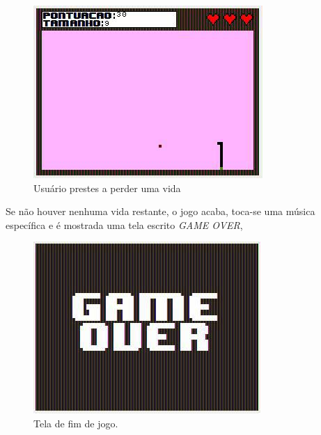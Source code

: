 \documentclass[a4paper]{sbgames}
\begin{document}
{{\begin{figure}[htb]
  \begin{center}
   \includegraphics[width=1.0\linewidth]{./Figures/snake1.jpg}
  \caption{Usuário prestes a perder uma vida}
  \end{center}
  \label{fig:05}
\end{figure}

Se não houver nenhuma vida restante, o jogo acaba, toca-se uma música específica e é mostrada uma tela escrito \textit{GAME OVER},

\begin{figure}[htb]
  \begin{center}
   \includegraphics[width=1.0\linewidth]{./Figures/gameover.jpg}
  \caption{Tela de fim de jogo.}
  \end{center}
  \label{fig:06}
\end{figure}

}}
\end{document}
